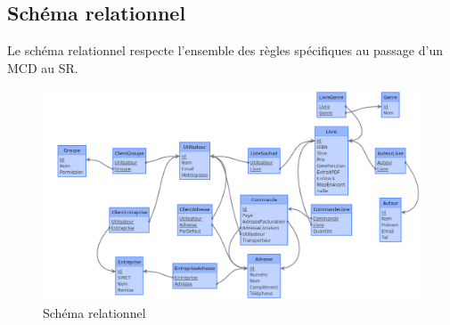 \documentclass[14pt]{extarticle}
\begin{document}
\subsection{Schéma relationnel}
Le schéma relationnel respecte l'ensemble des règles spécifiques au passage d'un MCD au SR.
\begin{figure}[H]
    \centering
    \includegraphics[width=1\linewidth]{images/sr.png}
    \caption{Schéma relationnel}
\end{figure}
\end{document}
